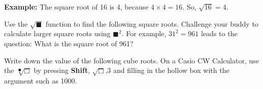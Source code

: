 \documentclass[12pt, a4paper, addpoints]{exam}
\newcommand{\ts}{\vspace{11mm}}
\begin{document}
\begin{questions}
\textbf{Example:} The square root of 16 is 4, because \(4 \times 4 = 16\). So, \(\sqrt{16} = 4\). 

Use the $\sqrt{\blacksquare}$ function to find the following square roots. Challenge your buddy to calculate larger square roots using \(\blacksquare^2\). For example, \(31^2 = 961\) leads to the question: What is the square root of 961?

\setlength{\columnsep}{15pt}
\begin{multicols}{6}
\end{multicols}
\ts



\question Write down the value of the following cube roots. On a Casio CW Calculator, use the $\sqrt[\blacksquare]{\Box}$  by pressing \textbf{Shift},   $\sqrt{\Box}$,3 and filling in the  hollow box with the argument such as 1000.

\setlength{\columnsep}{20pt}
\begin{multicols}{5}
\end{multicols}
\end{questions}
\end{document}

